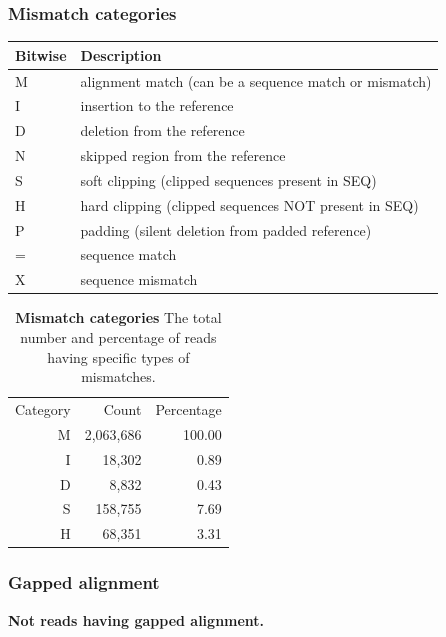 \documentclass{article}
\begin{document}
\subsubsection{Mismatch categories}
\begin{center}
\begin{tabular}{ll}
  \hline
Bitwise & Description \\ 
  \hline
M & alignment match (can be a sequence match or mismatch) \\ 
  I & insertion to the reference \\ 
  D & deletion from the reference \\ 
  N & skipped region from the reference \\ 
  S & soft clipping (clipped sequences present in SEQ) \\ 
  H & hard clipping (clipped sequences NOT present in SEQ) \\ 
  P & padding (silent deletion from padded reference) \\ 
  = & sequence match \\ 
  X & sequence mismatch \\ 
   \hline
\end{tabular}\end{center}

\begin{table}
\begin{tabular}{|r|r|r|}
  \hline
Category & Count & Percentage \\ 
  \rowcolor[gray]{0.9} \hline
M & 2,063,686 & 100.00 \\ 
  I &    18,302 &   0.89 \\ 
   \rowcolor[gray]{0.9}D &     8,832 &   0.43 \\ 
  S &   158,755 &   7.69 \\ 
   \rowcolor[gray]{0.9}H &    68,351 &   3.31 \\ 
   \hline
\end{tabular}\caption{\textbf{Mismatch categories} The total number and percentage of reads having specific types of mismatches.}
\end{table}

\subsubsection{Gapped alignment}
\textbf{Not reads having gapped alignment.}
\end{document}
